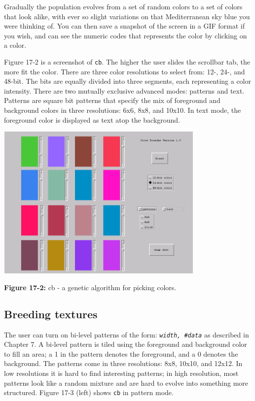 Gradually the population evolves from a set of random colors to a set of
colors that look alike, with ever so slight variations on that
Mediterranean sky blue you were thinking of. You can then save a
snapshot of the screen in a GIF format if you wish, and can see the
numeric codes that represents the color by clicking on a color.

Figure 17-2 is a screenshot of \texttt{cb}. The higher the user
slides the scrollbar tab, the more fit the color. There are three
color resolutions to select from: 12-, 24-, and 48-bit.
The bits are equally divided into three segments, each representing a
color intensity. There are two mutually exclusive advanced modes:
patterns and text. Patterns are square bit patterns that specify the
mix of foreground and background colors in three
resolutions: 6x6, 8x8, and 10x10. In text mode, the
foreground color is displayed as text atop the background.

\begin{center}
\includegraphics[width=4.0in,height=3.0in]{ub-img/ub-img46.png}
\end{center}

{\sffamily\bfseries Figure 17-2:}
{\sffamily cb - a genetic algorithm for picking colors.}



\subsection*{Breeding textures}

The user can turn on bi-level patterns of the form: \texttt{\textit{width,
\#data}} as described in Chapter 7. A bi-level pattern is tiled using
the foreground and background color to fill an area; a 1 in the
pattern denotes the foreground, and a 0 denotes the background. The
patterns come in three resolutions: 8x8, 10x10,
and 12x12. In low resolutions it is hard to find interesting patterns;
in high resolution, most patterns look like a random mixture and are
hard to evolve into something more structured. Figure 17-3 (left) shows
\texttt{cb} in pattern mode.

